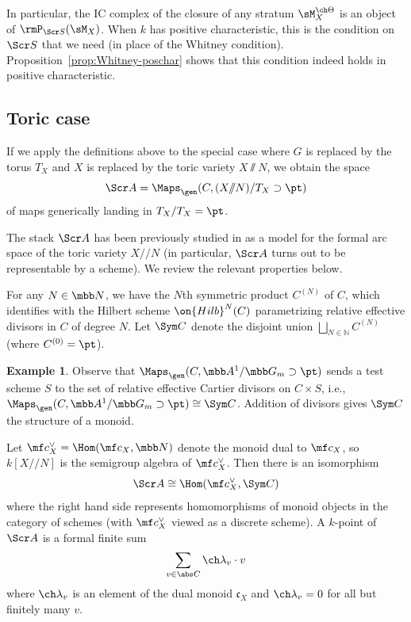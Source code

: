 \documentclass[final]{amsart}
\theoremstyle{remark}
\theoremstyle{definition}
\newtheorem{eg}[subsubsection]{Example}
\numberwithin{equation}{section}
\begin{document}
In particular, the IC complex of the closure of any stratum $\sM_X^{\ch\Theta}$ 
is an object of $\rmP_{\Scr S}(\sM_X)$.
When $k$ has positive characteristic, this is the condition on $\Scr S$ 
that we need (in place of the Whitney condition). 
Proposition~\ref{prop:Whitney-poschar} shows that this condition 
indeed holds in positive characteristic.


\subsection{Toric case} \label{sect:baseA}
If we apply the definitions above to the special case where $G$ is replaced by the torus $T_X$ and $X$ is replaced by the toric variety $X\sslash N$, we obtain the space \begin{equation}  \label{e:defA}
    \Scr A = \Maps_\gen(C, (X/\!\!/N)/T_X \supset \pt) 
\end{equation}
of maps generically landing in $T_X/T_X=\pt$. 



The stack $\Scr A$ has been previously studied in \cite[\S 3]{BNS} as 
a model for the formal arc space of the toric variety $X/\!\!/N$ 
(in particular, $\Scr A$ turns out to be representable by a scheme). 
We review the relevant properties below.

For any $N \in \mbb N$, we have the $N$th symmetric product
$C^{(N)}$ of $C$, which identifies with the Hilbert scheme $\on{Hilb}^N(C)$
parametrizing relative effective divisors in $C$ of degree $N$.
Let $\Sym C$ denote the disjoint union 
$\bigsqcup_{N\in \mathbb N} C^{(N)}$ (where $C^{(0)}=\pt$). 


\begin{eg}
Observe that $\Maps_\gen(C, \mbb A^1/\mbb G_m\supset \pt)$ sends a test scheme $S$ to 
the set of relative effective Cartier divisors on $C \times S$, i.e., 
$\Maps_\gen(C, \mbb A^1/\mbb G_m\supset \pt) \cong \Sym C$. 
Addition of divisors gives $\Sym C$ the structure of a monoid. 
\end{eg}


Let $\mf c_X^\vee = \Hom(\mf c_X, \mbb N)$ denote the monoid dual 
to $\mf c_X$, so $k[X/\!\!/N]$ is the semigroup algebra of $\mf c_X^\vee$. 
Then there is an isomorphism 
\[ \Scr A \cong \Hom(\mf c_X^\vee, \Sym C) \] 
where the right hand side represents homomorphisms of monoid objects in the category of schemes
(with $\mf c_X^\vee$ viewed as a discrete scheme). 
A $k$-point of $\Scr A$ is a formal finite sum 
\[ \sum_{v\in \abs C} \ch\lambda_v \cdot v \]
where $\ch\lambda_v$ is an element of the dual monoid $\mathfrak c_X$ and $\ch\lambda_v=0$ for all but finitely many $v$. 
\end{document}
